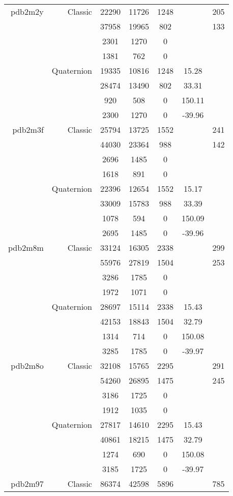 \begin{xltabular}{\textwidth}{r|rcccSc}
pdb2m2y & Classic & 22290 & 11726 & 1248 & & 205 \\
& & 37958 & 19965 & 802 & & 133 \\
& & 2301 & 1270 & 0 & & \\
& & 1381 & 762 & 0 & & \\
& Quaternion & 19335 & 10816 & 1248 & 15.28 & \\
& & 28474 & 13490 & 802 & 33.31 & \\
& & 920 & 508 & 0 & 150.11 & \\
& & 2300 & 1270 & 0 & -39.96 & \\ \addlinespace
pdb2m3f & Classic & 25794 & 13725 & 1552 & & 241 \\
& & 44030 & 23364 & 988 & & 142 \\
& & 2696 & 1485 & 0 & & \\
& & 1618 & 891 & 0 & & \\
& Quaternion & 22396 & 12654 & 1552 & 15.17 & \\
& & 33009 & 15783 & 988 & 33.39 & \\
& & 1078 & 594 & 0 & 150.09 & \\
& & 2695 & 1485 & 0 & -39.96 & \\ \addlinespace
pdb2m8m & Classic & 33124 & 16305 & 2338 & & 299 \\
& & 55976 & 27819 & 1504 & & 253 \\
& & 3286 & 1785 & 0 & & \\
& & 1972 & 1071 & 0 & & \\
& Quaternion & 28697 & 15114 & 2338 & 15.43 & \\
& & 42153 & 18843 & 1504 & 32.79 & \\
& & 1314 & 714 & 0 & 150.08 & \\
& & 3285 & 1785 & 0 & -39.97 & \\ \addlinespace
pdb2m8o & Classic & 32108 & 15765 & 2295 & & 291 \\
& & 54260 & 26895 & 1475 & & 245 \\
& & 3186 & 1725 & 0 & & \\
& & 1912 & 1035 & 0 & & \\
& Quaternion & 27817 & 14610 & 2295 & 15.43 & \\
& & 40861 & 18215 & 1475 & 32.79 & \\
& & 1274 & 690 & 0 & 150.08 & \\
& & 3185 & 1725 & 0 & -39.97 & \\ \addlinespace
pdb2m97 & Classic & 86374 & 42598 & 5896 & & 785 \\

\end{xltabular}

